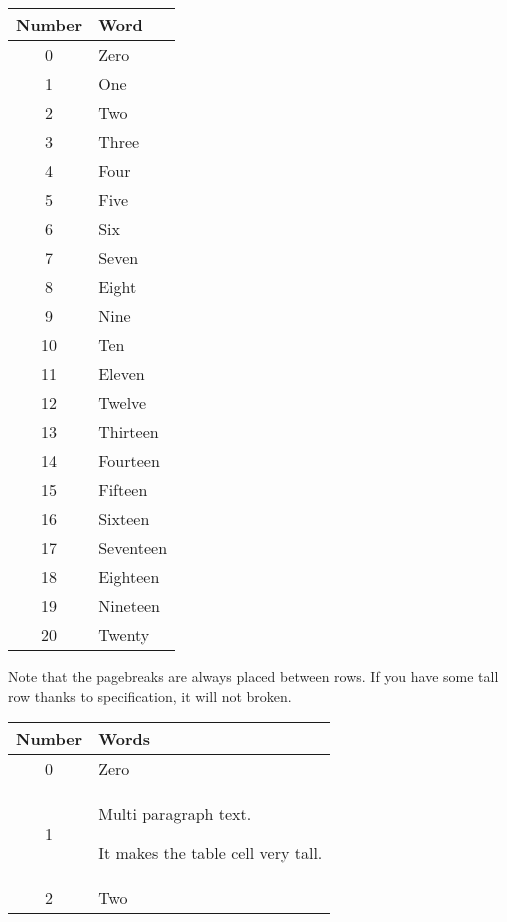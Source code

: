 \begin{example}[standalone, to_page=2, paperwidth=4.5cm] 
\usepackage{longtable}
\usepackage{booktabs}

\begin{longtable}{cl}
  \toprule
  Number & Word   \\
  \midrule
  0      & Zero   \\
  1      & One    \\
  2      & Two    \\
  3      & Three \\
  4      & Four  \\
  5      & Five  \\
  6      & Six   \\
  7      & Seven \\
  8      & Eight \\
  9      & Nine  \\
  10     & Ten       \\
  11     & Eleven    \\
  12     & Twelve    \\
  13     & Thirteen  \\
  14     & Fourteen  \\
  15     & Fifteen   \\
  16     & Sixteen   \\
  17     & Seventeen \\
  18     & Eighteen  \\
  19     & Nineteen  \\
  20     & Twenty \\
  \bottomrule
\end{longtable}
\end{example}

Note that the pagebreaks are always placed between rows. If you have some tall
row thanks to  specification, it will not broken.
\begin{example}[standalone, to_page=2, paperwidth=4.5cm] 
\usepackage{longtable}
\usepackage{booktabs}

\begin{longtable}{
  cp{1cm}
}
  \toprule
  Number & Words  \\
  \midrule
  0      & Zero   \\
  1      & Multi
           paragraph
           text.

           It makes
           the table
           cell very
           tall.  \\
  2      & Two    \\
  \bottomrule
\end{longtable}
\end{example}

